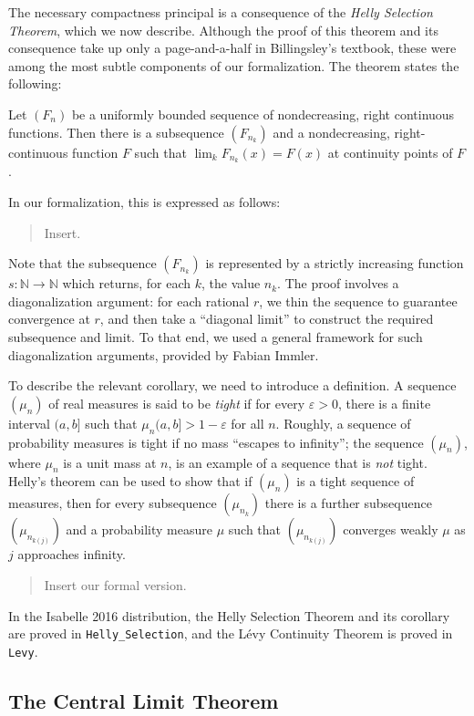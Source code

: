\documentclass{svjour3}
\newcommand{\todo}[1]{{\color{red}#1}}
\newcommand{\NN}{\mathbb{N}}
\begin{document}
The necessary compactness principal is a consequence of the \emph{Helly Selection Theorem}, which we now describe. Although the proof of this theorem and its consequence take up only a page-and-a-half in Billingsley's textbook, these were among the most subtle components of our formalization. The theorem states the following:
\begin{theorem}
Let $(F_n)$ be a uniformly bounded sequence of nondecreasing, right continuous functions. Then there is a subsequence $(F_{n_k})$ and a nondecreasing, right-continuous function $F$ such that $\lim_k F_{n_k}(x) = F(x)$ at continuity points of $F$.  
\end{theorem}
In our formalization, this is expressed as follows:
\begin{quote}
  Insert.
\end{quote}
Note that the subsequence $(F_{n_k})$ is represented by a strictly increasing function $s : \NN \to \NN$ which returns, for each $k$, the value $n_k$. The proof involves a diagonalization argument: for each rational $r$, we thin the sequence to guarantee convergence at $r$, and then take a ``diagonal limit'' to construct the required subsequence and limit. To that end, we used a general framework for such diagonalization arguments, provided by Fabian Immler.

To describe the relevant corollary, we need to introduce a definition. A sequence $(\mu_n)$ of real measures is said to be \emph{tight} if for every $\varepsilon > 0$, there is a finite interval $(a, b]$ such that $\mu_n(a, b] > 1 - \varepsilon$ for all $n$. Roughly, a sequence of probability measures is tight if no mass ``escapes to infinity''; the sequence $(\mu_n)$, where $\mu_n$ is a unit mass at $n$, is an example of a sequence that is \emph{not} tight. Helly's theorem can be used to show that if $(\mu_n)$ is a tight sequence of measures, then for every subsequence $(\mu_{n_k})$ there is a further subsequence $(\mu_{n_{k(j)}})$ and a probability measure $\mu$ such that $(\mu_{n_{k(j)}})$ converges weakly $\mu$ as $j$ approaches infinity.
\begin{quote}
 \todo{Insert our formal version.}
\end{quote}

In the Isabelle 2016 distribution, the Helly Selection Theorem and its corollary are proved in \verb=Helly_Selection=, and the L\'evy Continuity Theorem is proved in \verb=Levy=.

\subsection{The Central Limit Theorem}
\end{document}
